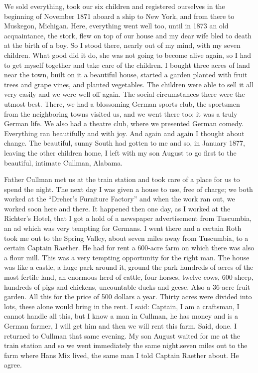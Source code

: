 \documentclass{article}
\begin{document}
We sold everything, took our six children and registered ourselves in the beginning of November 1871 aboard a ship to New York, and from there to Muskegon, Michigan. Here, everything went well too, until in 1873 an old acquaintance, the stork, flew on top of our house and my dear wife bled to death at the birth of a boy. So I stood there, nearly out of my mind, with my seven children. What good did it do, she was not going to become alive again, so I had to get myself together and take care of the children. I bought three acres of land near the town, built on it a beautiful house, started a garden planted with fruit trees and grape vines, and planted vegetables. The children were able to sell it all very easily and we were well off again. The social circumstances there were the utmost best. There, we had a blossoming German sports club, the sportsmen from the neighboring towns visited us, and we went there too; it was a truly German life. We also had a theatre club, where we presented German comedy. Everything ran beautifully and with joy. And again and again I thought about change. The beautiful, sunny South had gotten to me and so, in January 1877, leaving the other children home, I left with my son August to go first to the beautiful, intimate Cullman, Alabama.

Father Cullman met us at the train station and took care of a place for us to spend the night. The next day I was given a house to use, free of charge; we both worked at the ``Dreher's Furniture Factory'' and when the work ran out, we worked soon here and there. It happened then one day, as I worked at the Richter's Hotel, that I got a hold of a newspaper advertisement from Tuscumbia, an ad which was very tempting for Germans. I went there and a certain Roth took me out to the Spring Valley, about seven miles away from Tuscumbia, to a certain Captain Raether. He had for rent a 600-acre farm on which there was also a flour mill. This was a very tempting opportunity for the right man. The house was like a castle, a huge park around it, ground the park hundreds of acres of the most fertile land, an enormous herd of cattle, four horses, twelve cows, 600 sheep, hundreds of pigs and chickens, uncountable ducks and geese. Also a 36-acre fruit garden. All this for the price of 500 dollars a year. Thirty acres were divided into lots, these alone would bring in the rent. I said: Captain, I am a craftsman, I cannot handle all this, but I know a man in Cullman, he has money and is a German farmer, I will get him and then we will rent this farm. Said, done. I returned to Cullman that same evening. My son August waited for me at the train station and so we went immediately the same night.seven miles out to the farm where Hans Mix lived, the same man I told Captain Raether about. He agree.
\end{document}
